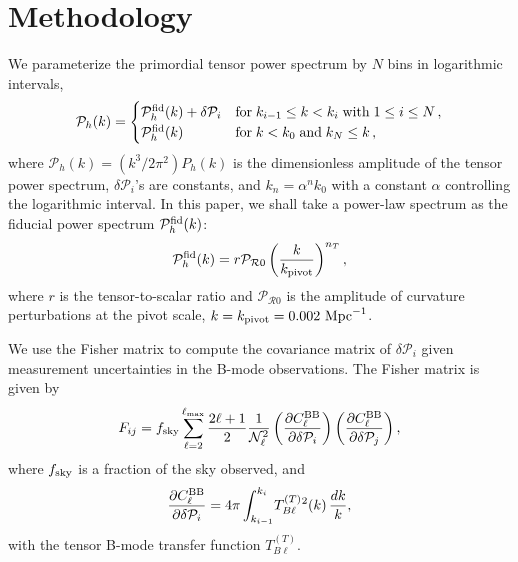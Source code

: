 \documentclass[tightenlines,floats,aps,nofootinbib,prd,onecolumn,preprintnumbers]{revtex4}
\newcommand{\PP}{\mathcal{P}}
\newcommand{\calR}{\mathcal{R}}
\begin{document}
\section{Methodology}
\label{sec:method}
We parameterize the primordial tensor power spectrum by $N$ bins in
logarithmic intervals,
%
\begin{equation}
 \PP_h(k) = 
\begin{cases}
\PP_h^{\rm fid}(k) + \delta \PP_i & {\rm for}\;k_{i-1}\leq k<k_i\;{\rm
 with}\;1\leq i\leq N\,, \\
\PP_h^{\rm fid}(k)              & {\rm for}\; k<k_0\;{\rm and}\;k_N\leq k\,,
 \end{cases}
 \label{eq:bandpower}
\end{equation}
%
where $\PP_h(k) = (k^3/2\pi^2)P_h(k)$ is the dimensionless amplitude
of the tensor power spectrum, $\delta \PP_i$'s are constants, and
$k_n=\alpha^nk_0$ with a constant $\alpha$ controlling the logarithmic
interval. In this paper, we shall take a power-law spectrum as the fiducial
power spectrum $\PP_h^{\rm fid}(k)$:
%
\begin{equation}
\PP_h^{\rm fid}(k) = r\PP_{\calR 0}\left(\frac{k}{k_{\rm pivot}}\right)^{n_T},
\label{eq:fiducial}
\end{equation}
%
where $r$ is the tensor-to-scalar ratio and $\PP_{\calR 0}$ is the
amplitude of curvature perturbations at the pivot scale, $k=k_{\rm
pivot}=0.002~{\rm Mpc}^{-1}$.

We use the Fisher matrix to compute the covariance matrix of
$\delta\PP_i$ given measurement uncertainties in the B-mode
observations. The Fisher matrix is given by
%
\begin{equation}
 F_{ij} = f_{\rm sky}\sum_{\ell=2}^{\ell_{\rm max}}\frac{2\ell+1}{2}
  \frac{1}{\mathcal{N}_\ell^2}
 \left(\frac{\partial C^{\rm BB}_\ell}{\partial\delta \PP_i}\right)
 \left(\frac{\partial C^{\rm BB}_\ell}{\partial\delta \PP_j}\right),
\label{eq:fisher}
\end{equation}
%
where $f_{\rm sky}$ is a fraction of the sky observed, and
%
\begin{equation}
 \frac{\partial C^{\rm BB}_\ell}{\partial\delta \PP_i}
 =
  4\pi\int_{k_{i-1}}^{k_i}\!T^{(T)}_{B\ell}{}^2(k)\,\frac{dk}{k},
\end{equation}
%
with the tensor B-mode transfer function $T^{(T)}_{B\ell}$.
\end{document}
